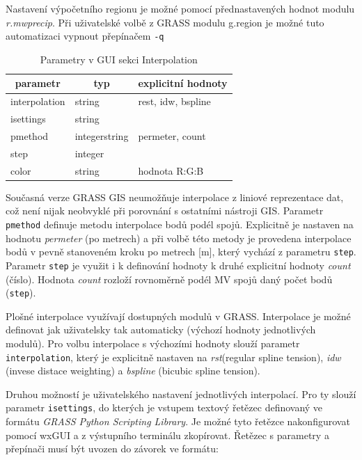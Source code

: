 \documentclass[a4paper,12pt,oneside]{report}
\begin{document}
Nastavení  výpočetního regionu je možné pomocí přednastavených hodnot modulu \textit{r.mwprecip}. Při uživatelské volbě z GRASS modulu g.region je možné tuto automatizaci vypnout přepínačem \texttt{-q}
\begin{table}[h]
\centering
\begin{tabular}{|lll|}
\hline
\multicolumn{1}{|c}{parametr} & \multicolumn{1}{c}{typ} & \multicolumn{1}{c|}{explicitní hodnoty} \\ \hline\hline
interpolation                          & string                  & rest, idw, bspline           \\
isettings                              & string                  &                              \\
pmethod                                & integerstring           & permeter, count              \\
step                                   & integer                 &                              \\
color                                  & string                  & hodnota R:G:B                \\ \hline
\end{tabular}
\caption{Parametry v GUI sekci Interpolation}
\end{table}
Současná verze GRASS GIS neumožňuje interpolace z liniové reprezentace dat, což není nijak neobvyklé při porovnání s ostatními nástroji GIS. Parametr \texttt{pmethod} definuje metodu interpolace bodů podél spojů. Explicitně je nastaven na hodnotu \emph{permeter} (po metrech) a při volbě této metody je provedena interpolace bodů v pevně stanoveném kroku po metrech [m], který vychází z parametru \texttt{step}. Parametr \texttt{step} je využit i k definování hodnoty k druhé explicitní hodnoty \emph{count} (číslo). Hodnota \emph{count} rozloží rovnoměrně podél MV spojů daný počet bodů (\texttt{step}).

Plošné interpolace využívají dostupných modulů v GRASS. Interpolace je možné definovat jak uživatelsky tak automaticky (výchozí hodnoty jednotlivých modulů). Pro volbu interpolace s výchozími hodnoty slouží parametr \texttt{interpolation}, který je explicitně nastaven na \emph{rst}(regular spline tension), \emph{idw} (invese distace weighting) a \emph{bspline} (bicubic spline tension). 

Druhou možností je uživatelského nastavení jednotlivých interpolací. Pro ty slouží parametr \texttt{isettings}, do kterých je vstupem textový řetězec definovaný ve formátu \textit{GRASS Python Scripting Library}. Je možné tyto řetězce nakonfigurovat pomocí wxGUI a z výstupního terminálu zkopírovat. Řetězec s parametry a přepínači musí být uvozen do závorek ve formátu:     
\end{document}
